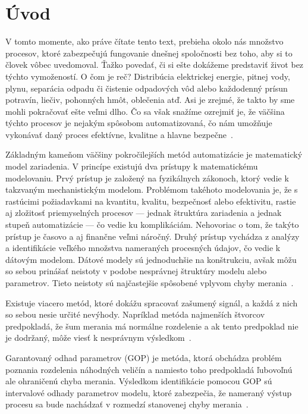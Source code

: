 \chapter*{Úvod}
V tomto momente, ako práve čítate tento text, prebieha okolo nás množstvo procesov, ktoré zabezpečujú fungovanie dnešnej spoločnosti bez toho, aby si to človek vôbec uvedomoval. Ťažko povedať, či si ešte dokážeme predstaviť život bez týchto vymožeností. O čom je reč? Distribúcia elektrickej energie, pitnej vody, plynu, separácia 
odpadu či čistenie odpadových vôd alebo každodenný prísun potravín, liečiv, pohonných hmôt, oblečenia atď. Asi je zrejmé, že takto by sme mohli pokračovať ešte veľmi dlho. Čo sa však snažíme ozrejmiť je, že väčšina týchto procesov je nejakým spôsobom automatizovaná, čo nám umožňuje vykonávať daný proces efektívne, kvalitne a hlavne bezpečne~\cite{spautz:automat_pros:1994}. 

Základným kameňom väčšiny pokročilejších metód automatizácie je matematický model zariadenia. V princípe existujú dva prístupy k matematickému modelovaniu. Prvý prístup je založený na fyzikálnych zákonoch, ktorý vedie k takzvaným mechanistickým modelom. Problémom takéhoto modelovania je, že s rastúcimi požiadavkami na kvantitu, kvalitu, bezpečnosť alebo efektivitu, rastie aj zložitosť priemyselných procesov --- jednak štruktúra zariadenia a jednak stupeň automatizácie --- čo vedie ku komplikáciám. Nehovoriac o tom, že takýto prístup je časovo a aj finančne veľmi náročný. Druhý prístup vychádza z analýzy a identifikácie veľkého množstva nameraných procesných údajov, čo vedie k dátovým modelom. Dátové modely sú jednoduchšie na konštrukciu, avšak môžu so sebou prinášať neistoty v podobe nesprávnej štruktúry modelu alebo parametrov. Tieto neistoty sú najčastejšie spôsobené vplyvom chyby merania~\cite{evans:data_modelling:1992}.

Existuje viacero metód, ktoré dokážu spracovať zašumený signál, a každá z nich so sebou nesie určité nevýhody. Napríklad metóda najmenších štvorcov predpokladá, že šum merania má normálne rozdelenie a ak tento predpoklad nie je dodržaný, môže viesť k nesprávnym výsledkom~\cite{martin:lsq_method:2012}.

Garantovaný odhad parametrov (GOP) je metóda, ktorá obchádza problém poznania rozdelenia náhodných veličín a namiesto toho predpokladá ľubovoľnú ale ohraničenú chyba merania. Výsledkom identifikácie pomocou GOP sú intervalové odhady parametrov modelu, ktoré zabezpečia, že nameraný výstup procesu sa bude nachádzať v rozmedzí stanovenej chyby merania~\cite{paulen:gpe:2017}.  

